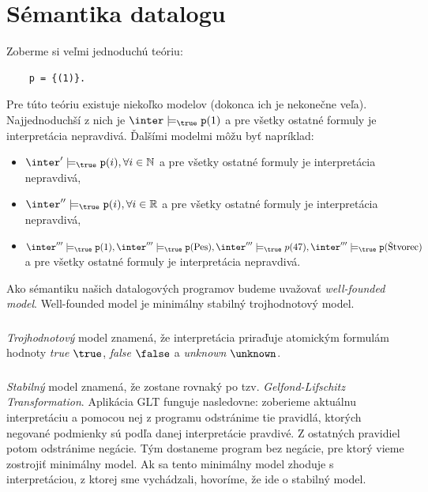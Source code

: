 \section{Sémantika datalogu}
Zoberme si veľmi jednoduchú teóriu: 
\begin{verbatim}
    p = {(1)}.    
\end{verbatim}

Pre túto teóriu existuje niekoľko modelov (dokonca ich je nekonečne veľa). Najjednoduchší z nich je
$\inter \models_\true \verb|p|(1)$ a pre všetky ostatné formuly je interpretácia nepravdivá. Ďalšími
modelmi môžu byť napríklad:
\begin{itemize}
\item $\inter' \models_\true \verb|p|(i), \forall i \in \mathbb{N}$ a pre všetky ostatné formuly je
interpretácia nepravdivá,
\item $\inter'' \models_\true \verb|p|(i), \forall i \in \mathbb{R}$ a pre všetky ostatné formuly je
interpretácia nepravdivá,
\item $\inter''' \models_\true \verb|p|(1), \inter''' \models_\true \verb|p|(\text{Pes}), \inter'''
\models_\true p(47), \inter''' \models_\true \verb|p|(\text{Štvorec})$ a pre všetky ostatné formuly
je interpretácia nepravdivá.
\end{itemize}

Ako sémantiku našich datalogových programov budeme uvažovať \textit{well-founded model}.
Well-founded model je minimálny stabilný trojhodnotový model.

\subsubsection{}
\textit{Trojhodnotový} model znamená, že interpretácia priraďuje atomickým formulám hodnoty
\textit{true} $\true$, \textit{false} $\false$ a \textit{unknown} $\unknown$.

\subsubsection{}
\textit{Stabilný} model znamená, že zostane rovnaký po tzv. \textit{Gelfond-Lifschitz
Transformation}. Aplikácia GLT funguje nasledovne: zoberieme aktuálnu interpretáciu a pomocou nej z
programu odstránime tie pravidlá, ktorých negované podmienky sú podľa danej interpretácie pravdivé.
Z ostatných pravidiel potom odstránime negácie. Tým dostaneme program bez negácie, pre ktorý vieme
zostrojiť minimálny model. Ak sa tento minimálny model zhoduje s interpretáciou, z ktorej sme
vychádzali, hovoríme, že ide o stabilný model.

